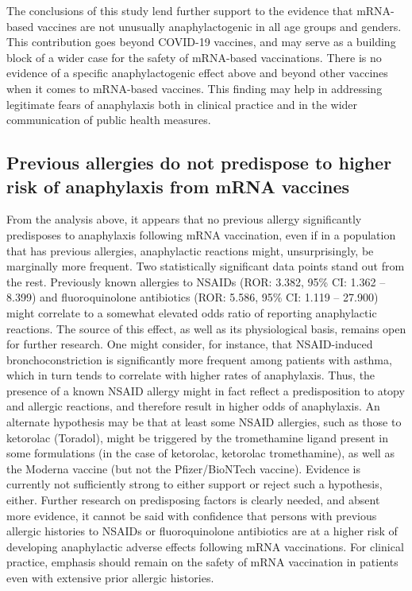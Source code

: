 \documentclass{article}
\begin{document}
The conclusions of this study lend further support to the evidence that mRNA-based vaccines are not unusually anaphylactogenic in all age groups and genders.
This contribution goes beyond COVID-19 vaccines, and may serve as a building block of a wider case for the safety of mRNA-based vaccinations.
There is no evidence of a specific anaphylactogenic effect above and beyond other vaccines when it comes to mRNA-based vaccines.
This finding may help in addressing legitimate fears of anaphylaxis both in clinical practice and in the wider communication of public health measures.


\subsection{Previous allergies do not predispose to higher risk of anaphylaxis from mRNA vaccines}

From the analysis above, it appears that no previous allergy significantly predisposes to anaphylaxis following mRNA vaccination, even if in a population that has previous allergies, anaphylactic reactions might, unsurprisingly, be marginally more frequent.
Two statistically significant data points stand out from the rest.
Previously known allergies to NSAIDs (ROR: 3.382, 95\% CI: 1.362 -- 8.399) and fluoroquinolone antibiotics (ROR: 5.586, 95\% CI: 1.119 -- 27.900) might correlate to a somewhat elevated odds ratio of reporting anaphylactic reactions.
The source of this effect, as well as its physiological basis, remains open for further research.
One might consider, for instance, that NSAID-induced bronchoconstriction is significantly more frequent among patients with asthma,\cite{morales2015nsaid} which in turn tends to correlate with higher rates of anaphylaxis.
Thus, the presence of a known NSAID allergy might in fact reflect a predisposition to atopy and allergic reactions, and therefore result in higher odds of anaphylaxis.
An alternate hypothesis may be that at least some NSAID allergies, such as those to ketorolac (Toradol), might be triggered by the tromethamine ligand present in some formulations (in the case of ketorolac, ketorolac tromethamine), as well as the Moderna vaccine (but not the Pfizer/BioNTech vaccine).
Evidence is currently not sufficiently strong to either support or reject such a hypothesis, either.
Further research on predisposing factors is clearly needed, and absent more evidence, it cannot be said with confidence that persons with previous allergic histories to NSAIDs or fluoroquinolone antibiotics are at a higher risk of developing anaphylactic adverse effects following mRNA vaccinations.
For clinical practice, emphasis should remain on the safety of mRNA vaccination in patients even with extensive prior allergic histories.
\end{document}
